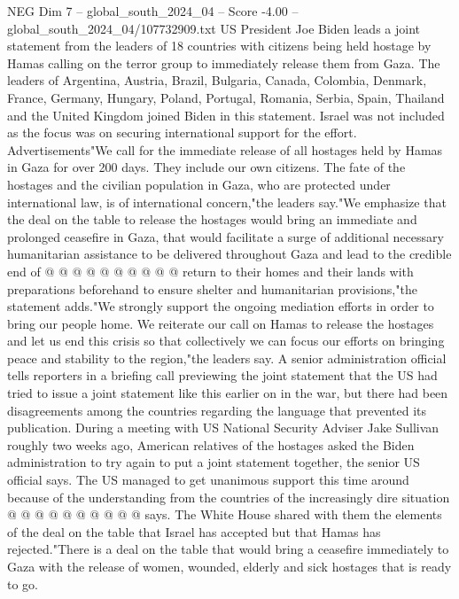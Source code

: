 \begin{textsample}{NEG Dim 7 – global\_south\_2024\_04 – Score -4.00 – global\_south\_2024\_04/107732909.txt}  \label{ex:f7_neg_349}
US President Joe Biden leads a joint statement from the leaders of 18 countries with citizens being held hostage by Hamas calling on the terror group to immediately release them from Gaza.
The leaders of Argentina, Austria, Brazil, Bulgaria, Canada, Colombia, Denmark, France, Germany, Hungary, Poland, Portugal, Romania, Serbia, Spain, Thailand and the United Kingdom joined Biden in this statement.
Israel was not included as the focus was on securing international support for the effort.
Advertisements"We call for the immediate release of all hostages held by Hamas in Gaza for over 200 days.
They include our own citizens.
The fate of the hostages and the civilian population in Gaza, who are protected under international law, is of international concern,"the leaders say."We emphasize that the deal on the table to release the hostages would bring an immediate and prolonged ceasefire in Gaza, that would facilitate a surge of additional necessary humanitarian assistance to be delivered throughout Gaza and lead to the credible end of @ @ @ @ @ @ @ @ @ @ return to their homes and their lands with preparations beforehand to ensure shelter and humanitarian provisions,"the statement adds."We strongly support the ongoing mediation efforts in order to bring our people home.
We reiterate our call on Hamas to release the hostages and let us end this crisis so that collectively we can focus our efforts on bringing peace and stability to the region,"the leaders say.
A senior administration official tells reporters in a briefing call previewing the joint statement that the US had tried to issue a joint statement like this earlier on in the war, but there had been disagreements among the countries regarding the language that prevented its publication.
During a meeting with US National Security Adviser Jake Sullivan roughly two weeks ago, American relatives of the hostages asked the Biden administration to try again to put a joint statement together, the senior US official says.
The US managed to get unanimous support this time around because of the understanding from the countries of the increasingly dire situation @ @ @ @ @ @ @ @ @ @ says.
The White House shared with them the elements of the deal on the table that Israel has accepted but that Hamas has rejected."There is a deal on the table that would bring a ceasefire immediately to Gaza with the release of women, wounded, elderly and sick hostages that is ready to go.

\end{textsample}
